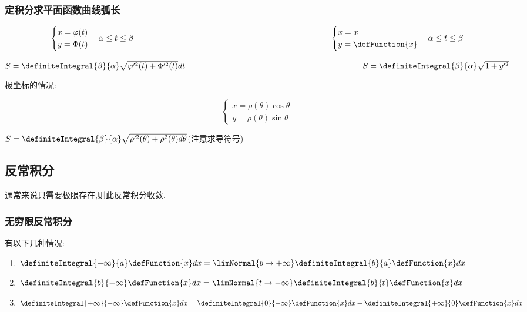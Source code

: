{{{}%

\subsubsection{定积分求平面函数曲线弧长}{

  $$
    \begin{cases}
      x = \varphi(t) \\
      y = \Phi(t)
    \end{cases}
    \alpha \leq t \leq \beta
    \qquad\qquad\qquad\qquad\qquad\qquad\qquad\qquad\qquad\qquad\qquad\qquad
    \begin{cases}
      x = x \\
      y = \defFunction{x}
    \end{cases}
    \alpha \leq t \leq \beta
  $$

  $S = \definiteIntegral{\beta}{\alpha}\sqrt{\varphi^{\prime 2}(t) + \Phi^{\prime 2}(t)}dt\qquad\qquad\qquad\qquad\qquad\qquad\qquad\qquad\qquad\qquad\qquad S = \definiteIntegral{\beta}{\alpha}\sqrt{1 + y^{\prime 2}}$

  极坐标的情况:

  $$
    \begin{cases}
      x = \rho(\theta)\cos\theta \\
      y = \rho(\theta)\sin\theta
    \end{cases}
  $$

  $S = \definiteIntegral{\beta}{\alpha}\sqrt{\rho^{\prime 2}(\theta) + \rho^2(\theta)d\theta}$\qquad(注意求导符号)
}%

}%

\subsection{反常积分}{
通常来说只需要极限存在,则此反常积分收敛.

\subsubsection{无穷限反常积分}{

  有以下几种情况:

  \begin{enumerate}
    \item $\definiteIntegral{+\infty}{a}\defFunction{x}dx = \limNormal{b \to +\infty}\definiteIntegral{b}{a}\defFunction{x}dx$
    \item $\definiteIntegral{b}{-\infty}\defFunction{x}dx = \limNormal{t \to -\infty}\definiteIntegral{b}{t}\defFunction{x}dx$
    \item $\definiteIntegral{+\infty}{-\infty}\defFunction{x}dx = \definiteIntegral{0}{-\infty}\defFunction{x}dx + \definiteIntegral{+\infty}{0}\defFunction{x}dx$
  \end{enumerate}
}%


}}
